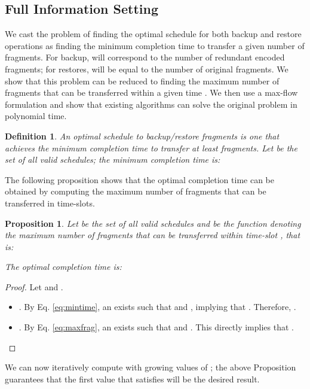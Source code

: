\documentclass[conference,10pt]{IEEEtran}
\newtheorem{definition}{Definition}
\newtheorem{proposition}{Proposition}
\newtheorem{proof}{Proof}
\begin{document}
\subsection{Full Information Setting}

We cast the problem of finding the optimal schedule for both backup
and restore operations as finding the minimum completion time to
transfer a given number  of fragments. For backup,  will
correspond to the number  of redundant encoded fragments; for
restores,  will be equal to the number  of original
fragments. We show that this problem can be reduced to finding the
maximum number of fragments that can be transferred within a given
time . We then use a max-flow formulation and show that existing
algorithms can solve the original problem in polynomial time.

\begin{definition}
	
	An \emph{optimal schedule} to backup/restore  fragments is one that achieves the minimum completion time to transfer at least  fragments. Let  be the set of all valid schedules; the minimum completion time is: 
	
\end{definition}

The following proposition shows that the optimal completion time can be obtained by computing the maximum number of fragments that can be transferred in  time-slots. 

\begin{proposition}
	Let  be the set of all valid schedules and  be the function denoting the maximum number of fragments that can be transferred within time-slot , that is: 
	
	The optimal completion time is:  
\end{proposition}
\begin{proof}
	Let  and . 
	\begin{itemize}
		\item . By Eq. \ref{eq:mintime}, an  exists such that  and , implying that . Therefore, .
		
		\item . By Eq. \ref{eq:maxfrag}, an  exists such that  and . This directly implies that . 
	\end{itemize}
\end{proof}

We can now iteratively compute  with growing values of ; the
above Proposition guarantees that the first value  that satisfies
 will be the desired result.
\end{document}
